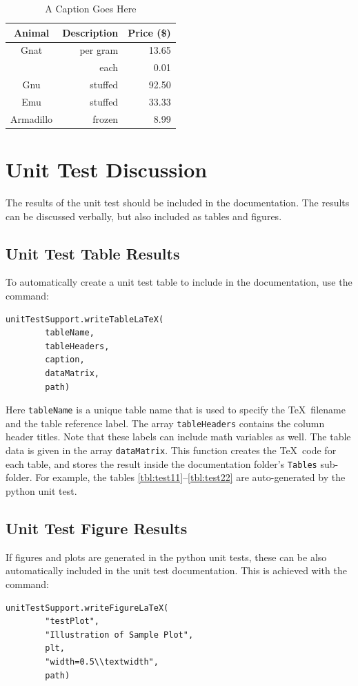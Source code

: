 \documentclass[]{BasiliskReportMemo}
\begin{document}
\begin{table}[htbp]
    \caption{A Caption Goes Here}
   \label{tab:label}
        \centering \fontsize{10}{10}\selectfont
   \begin{tabular}{c | r | r } %
      \hline 
      Animal    & Description & Price (\$)\\
      \hline 
      Gnat      & per gram & 13.65 \\
                & each     &  0.01 \\
      Gnu       & stuffed  & 92.50 \\
      Emu       & stuffed  & 33.33 \\
      Armadillo & frozen   &  8.99 \\
      \hline
   \end{tabular}
\end{table}


\section{Unit Test Discussion}
The results of the unit test should be included in the documentation.  The results can be discussed verbally, but also included as tables and figures.  

\subsection{Unit Test Table Results}
To automatically create a unit test table to include in the documentation, use the command:
\begin{verbatim}
unitTestSupport.writeTableLaTeX(
        tableName,
        tableHeaders,
        caption,
        dataMatrix,
        path)
\end{verbatim}
Here {\tt tableName} is a unique table name that is used to specify the \TeX\ filename and the table reference label.  The array {\tt tableHeaders} contains the column header titles.  Note that these labels can include math variables as well.  The table data is given in the array {\tt dataMatrix}.   This function creates the \TeX\ code for each table, and stores the result inside the documentation folder's {\tt Tables} sub-folder.  For example, the tables \ref{tbl:test11}--\ref{tbl:test22} are auto-generated by the python unit test.  






\subsection{Unit Test Figure Results}
If figures and plots are generated in the python unit tests, these can be also automatically included in the unit test documentation.  This is achieved with the command:
\begin{verbatim}
unitTestSupport.writeFigureLaTeX(
        "testPlot",
        "Illustration of Sample Plot",
        plt,
        "width=0.5\\textwidth",
        path)
\end{verbatim}
\end{document}
